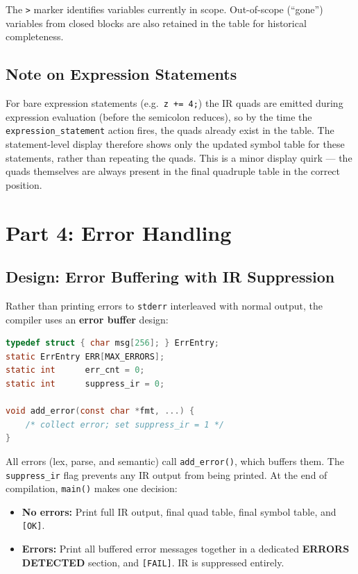 \documentclass[11pt]{article}
\begin{document}
The \texttt{>} marker identifies variables currently in scope. Out-of-scope (``gone'') variables from closed blocks are also retained in the table for historical completeness.

\subsection{Note on Expression Statements}

For bare expression statements (e.g.\ \texttt{z += 4;}) the IR quads are emitted during expression evaluation (before the semicolon reduces), so by the time the \texttt{expression\_statement} action fires, the quads already exist in the table. The statement-level display therefore shows only the updated symbol table for these statements, rather than repeating the quads. This is a minor display quirk --- the quads themselves are always present in the final quadruple table in the correct position.

\section{Part 4: Error Handling}

\subsection{Design: Error Buffering with IR Suppression}

Rather than printing errors to \texttt{stderr} interleaved with normal output, the compiler uses an \textbf{error buffer} design:

\begin{lstlisting}[style=cstyle, language=C]
typedef struct { char msg[256]; } ErrEntry;
static ErrEntry ERR[MAX_ERRORS];
static int      err_cnt = 0;
static int      suppress_ir = 0;

void add_error(const char *fmt, ...) {
    /* collect error; set suppress_ir = 1 */
}
\end{lstlisting}

All errors (lex, parse, and semantic) call \texttt{add\_error()}, which buffers them. The \texttt{suppress\_ir} flag prevents any IR output from being printed. At the end of compilation, \texttt{main()} makes one decision:

\begin{itemize}
    \item \textbf{No errors:} Print full IR output, final quad table, final symbol table, and \texttt{[OK]}.
    \item \textbf{Errors:} Print all buffered error messages together in a dedicated \textbf{ERRORS DETECTED} section, and \texttt{[FAIL]}. IR is suppressed entirely.
\end{itemize}
\end{document}
